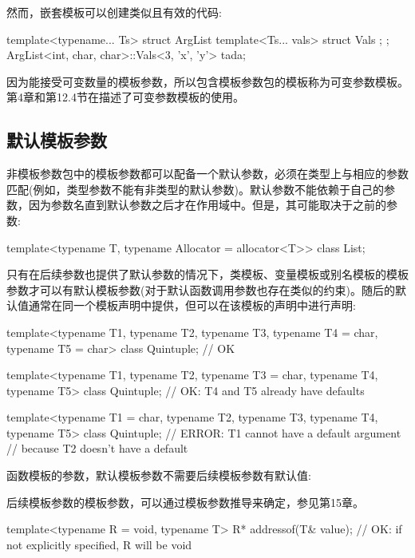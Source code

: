 然而，嵌套模板可以创建类似且有效的代码:

\begin{cpp}
template<typename... Ts> struct ArgList {
	template<Ts... vals> struct Vals {};
};
ArgList<int, char, char>::Vals<3, ’x’, ’y’> tada;
\end{cpp}

因为能接受可变数量的模板参数，所以包含模板参数包的模板称为可变参数模板。第4章和第12.4节在描述了可变参数模板的使用。

\subsection{默认模板参数}

非模板参数包中的模板参数都可以配备一个默认参数，必须在类型上与相应的参数匹配(例如，类型参数不能有非类型的默认参数)。默认参数不能依赖于自己的参数，因为参数名直到默认参数之后才在作用域中。但是，其可能取决于之前的参数:

\begin{cpp}
template<typename T, typename Allocator = allocator<T>>
class List;
\end{cpp}

只有在后续参数也提供了默认参数的情况下，类模板、变量模板或别名模板的模板参数才可以有默认模板参数(对于默认函数调用参数也存在类似的约束)。随后的默认值通常在同一个模板声明中提供，但可以在该模板的声明中进行声明:

\begin{cpp}
template<typename T1, typename T2, typename T3,
typename T4 = char, typename T5 = char>
class Quintuple; // OK

template<typename T1, typename T2, typename T3 = char,
typename T4, typename T5>
class Quintuple; // OK: T4 and T5 already have defaults

template<typename T1 = char, typename T2, typename T3,
typename T4, typename T5>
class Quintuple; // ERROR: T1 cannot have a default argument
// because T2 doesn’t have a default
\end{cpp}

函数模板的参数，默认模板参数不需要后续模板参数有默认值:

\begin{notice}后续模板参数的模板参数，可以通过模板参数推导来确定，参见第15章。
\end{notice}

\begin{cpp}
template<typename R = void, typename T>
R* addressof(T& value); // OK: if not explicitly specified, R will be void
\end{cpp}

